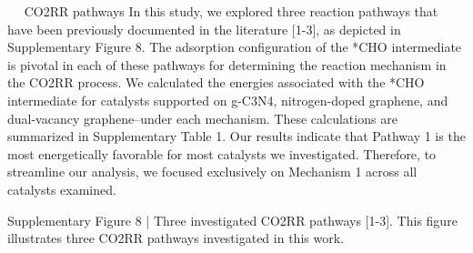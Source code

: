  
CO2RR pathways
In this study, we explored three reaction pathways that have been previously documented in the literature [1-3], as depicted in Supplementary Figure 8. The adsorption configuration of the *CHO intermediate is pivotal in each of these pathways for determining the reaction mechanism in the CO2RR process. We calculated the energies associated with the *CHO intermediate for catalysts supported on g-C3N4, nitrogen-doped graphene, and dual-vacancy graphene–under each mechanism. These calculations are summarized in Supplementary Table 1. Our results indicate that Pathway 1 is the most energetically favorable for most catalysts we investigated. Therefore, to streamline our analysis, we focused exclusively on Mechanism 1 across all catalysts examined.

Supplementary Figure 8 | Three investigated CO2RR pathways [1-3]. This figure illustrates three CO2RR pathways investigated in this work.

